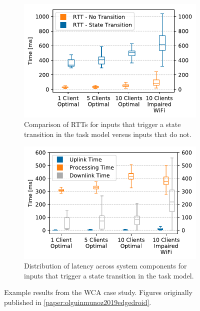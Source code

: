 \begin{figure}
    \begin{subfigure}[t]{.45\textwidth}
        \centering%
        \includegraphics[width=\textwidth]{publications/2019EdgeDroid/plots/comparison/nofonts/rtt_fb_vs_nofb}%
        \caption{
            Comparison of \acsp{RTT} for inputs that trigger a state transition in the task model versus inputs that do not.
        }\label{fig:wca:rtt}%
    \end{subfigure}%
    \hfill%
    \begin{subfigure}[t]{.45\textwidth}
        \centering%
        \includegraphics[width=\textwidth]{publications/2019EdgeDroid/plots/comparison/nofonts/box_feedback}%
        \caption{%
            Distribution of latency across system components for inputs that trigger a state transition in the task model.
        }\label{fig:wca:latency}
    \end{subfigure}%
    \caption{
        Example results from the \acs{WCA} case study.
        Figures originally published in \cref{paper:olguinmunoz2019edgedroid}.
    }
\end{figure}

